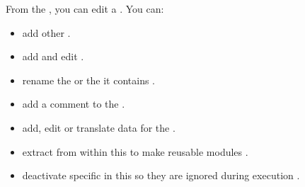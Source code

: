 
From the \gdtestcaseeditor{}, you can edit a \gdcase{}. You can:

\begin{itemize}
\item add other \gdcases{} .
\item add and edit \gdsteps{} .
\item rename the \gdcase{}  or the \gdcases{} it contains .
\item add a comment to the \gdcase{} .
\item add, edit or translate data for the \gdcase{} .
\item extract \gdcases{} from within this \gdcase{} to make reusable modules .
\item deactivate specific \gdcases{} in this \gdcase{} so they are ignored during execution .
\end{itemize}



